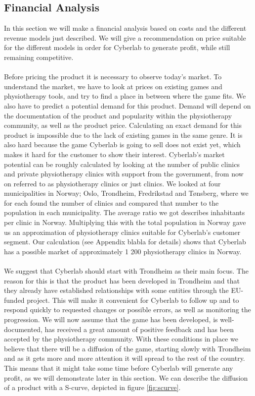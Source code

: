 \subsection{Financial Analysis}
In this section we will make a financial analysis based on costs and the different revenue models just described. We will give a recommendation on price suitable for the different models in order for Cyberlab to generate profit, while still remaining competitive. \\ \\
Before pricing the product it is necessary to observe today's market. To understand the market, we have to look at prices on existing games and physiotherapy tools, and try to find a place in between where the game fits. We also have to predict a potential demand for this product. Demand will depend on the documentation of the product and popularity within the physiotherapy community, as well as the product price. Calculating an exact demand for this product is impossible due to the lack of existing games in the same genre. It is also hard because the game Cyberlab is going to sell does not exist yet, which makes it hard for the customer to show their interest. Cyberlab’s market potential can be roughly calculated by looking at the number of public clinics and private physiotherapy clinics with support from the government, from now on referred to as physiotherapy clinics or just clinics. We looked at four municipalities in Norway; Oslo, Trondheim, Fredrikstad and T{ø}nsberg, where we for each found the number of clinics and compared that number to the population in each municipality. The average ratio we got describes inhabitants per clinic in Norway. Multiplying this with the total population in Norway gave us an approximation of physiotherapy clinics suitable for Cyberlab's customer segment. Our calculation (see Appendix blabla for details) shows that Cyberlab has a possible market of approximately 1 200 physiotherapy clinics in Norway. \\ \\
We suggest that Cyberlab should start with Trondheim as their main focus. The reason for this is that the product has been developed in Trondheim and that they already have established relationships with some entities through the EU- funded project. This will make it convenient for Cyberlab to follow up and to respond quickly to requested changes or possible errors, as well as monitoring the progression. We will now assume that the game has been developed, is well-documented, has received a great amount of positive feedback and has been accepted by the physiotherapy community. With these conditions in place we believe that there will be a diffusion of the game, starting slowly with Trondheim and as it gets more and more attention it will spread to the rest of the country. This means that it might take some time before Cyberlab will generate any profit, as we will demonstrate later in this section. We can describe the diffusion of a product with a S-curve, depicted in figure \ref{fig:scurve}. \\ \\
